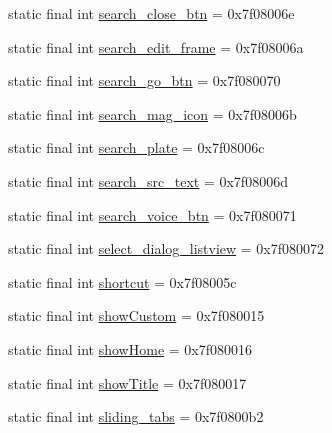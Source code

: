\begin{CompactItemize}
\item 
static final int \hyperlink{classandroid_1_1support_1_1v7_1_1mediarouter_1_1_r_1_1id_cdf53579d63f0d7e571232e940a1e83c}{search\_\-close\_\-btn} = 0x7f08006e
\item 
static final int \hyperlink{classandroid_1_1support_1_1v7_1_1mediarouter_1_1_r_1_1id_29474cba4809116afe18732f7523b3cd}{search\_\-edit\_\-frame} = 0x7f08006a
\item 
static final int \hyperlink{classandroid_1_1support_1_1v7_1_1mediarouter_1_1_r_1_1id_db10f82c5c0cb6b43ce3891f8e4723e0}{search\_\-go\_\-btn} = 0x7f080070
\item 
static final int \hyperlink{classandroid_1_1support_1_1v7_1_1mediarouter_1_1_r_1_1id_bd0fddae3e66de1450d70f208d445bf2}{search\_\-mag\_\-icon} = 0x7f08006b
\item 
static final int \hyperlink{classandroid_1_1support_1_1v7_1_1mediarouter_1_1_r_1_1id_3b9346c1625434fd8b1d3bceaa9b973b}{search\_\-plate} = 0x7f08006c
\item 
static final int \hyperlink{classandroid_1_1support_1_1v7_1_1mediarouter_1_1_r_1_1id_d35b83eb6efa2f654bbc1b1726be393e}{search\_\-src\_\-text} = 0x7f08006d
\item 
static final int \hyperlink{classandroid_1_1support_1_1v7_1_1mediarouter_1_1_r_1_1id_36323d997e985633cc1d7566801cdead}{search\_\-voice\_\-btn} = 0x7f080071
\item 
static final int \hyperlink{classandroid_1_1support_1_1v7_1_1mediarouter_1_1_r_1_1id_be17d1f9dfdd22570dc531a80f5c7fe8}{select\_\-dialog\_\-listview} = 0x7f080072
\item 
static final int \hyperlink{classandroid_1_1support_1_1v7_1_1mediarouter_1_1_r_1_1id_1922258abeb5b181b57652f927d19187}{shortcut} = 0x7f08005c
\item 
static final int \hyperlink{classandroid_1_1support_1_1v7_1_1mediarouter_1_1_r_1_1id_d1a40ed6f9957ba7343b222c3a776997}{showCustom} = 0x7f080015
\item 
static final int \hyperlink{classandroid_1_1support_1_1v7_1_1mediarouter_1_1_r_1_1id_868ad22fd7ae63181fcd3c7c97d21f69}{showHome} = 0x7f080016
\item 
static final int \hyperlink{classandroid_1_1support_1_1v7_1_1mediarouter_1_1_r_1_1id_21b7200d4012d31c79ea666a676dba28}{showTitle} = 0x7f080017
\item 
static final int \hyperlink{classandroid_1_1support_1_1v7_1_1mediarouter_1_1_r_1_1id_fe0f5387984e1d29d8a094ac2e04a312}{sliding\_\-tabs} = 0x7f0800b2
\item 

\end{CompactItemize}
